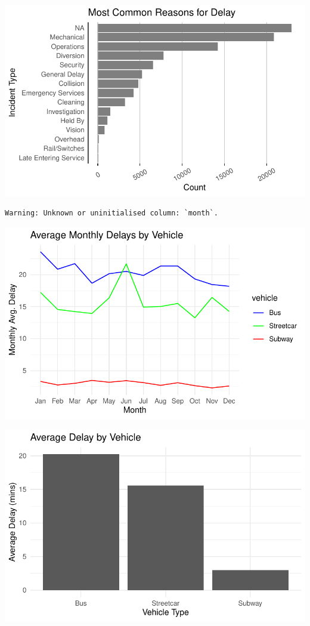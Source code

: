 \documentclass[
  letterpaper,
  DIV=11,
  numbers=noendperiod]{scrartcl}
\begin{document}
\includegraphics{paper_files/figure-pdf/common-reasons-delay-1.pdf}

\begin{verbatim}
Warning: Unknown or uninitialised column: `month`.
\end{verbatim}

\includegraphics{paper_files/figure-pdf/monthly-delay-times-1.pdf}

\includegraphics{paper_files/figure-pdf/mode-longest-delays-1.pdf}
\end{document}

